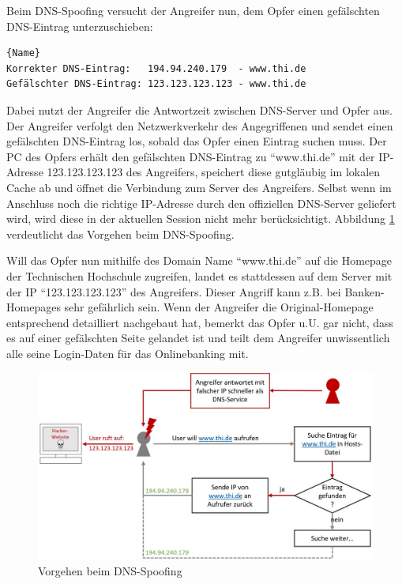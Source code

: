 Beim DNS-Spoofing versucht der Angreifer nun, dem Opfer einen gefälschten DNS-Eintrag unterzuschieben:
\begin{lstlisting}[caption=Echtes vs. gefälschtes DNS]{Name}
Korrekter DNS-Eintrag:   194.94.240.179  - www.thi.de
Gefälschter DNS-Eintrag: 123.123.123.123 - www.thi.de
\end{lstlisting}

Dabei nutzt der Angreifer die Antwortzeit zwischen DNS-Server und Opfer aus. Der Angreifer verfolgt den Netzwerkverkehr des Angegriffenen und sendet einen gefälschten DNS-Eintrag los, sobald das Opfer einen Eintrag suchen muss. Der PC des Opfers erhält den gefälschten DNS-Eintrag zu \enquote{www.thi.de} mit der IP-Adresse 123.123.123.123 des Angreifers, speichert diese gutgläubig im lokalen Cache ab und öffnet die Verbindung zum Server des Angreifers. Selbst wenn im Anschluss noch die richtige IP-Adresse durch den offiziellen DNS-Server geliefert wird, wird diese in der aktuellen Session nicht mehr berücksichtigt. Abbildung \ref{fig:poisoned_dns_lookup} verdeutlicht das Vorgehen beim DNS-Spoofing.

Will das Opfer nun mithilfe des Domain Name \enquote{www.thi.de} auf die Homepage der Technischen Hochschule zugreifen, landet es stattdessen auf dem Server mit der IP \enquote{123.123.123.123} des Angreifers. Dieser Angriff kann z.B. bei Banken-Homepages sehr gefährlich sein. Wenn der Angreifer die Original-Homepage entsprechend detailliert nachgebaut hat, bemerkt das Opfer u.U. gar nicht, dass es auf einer gefälschten Seite gelandet ist und teilt dem Angreifer unwissentlich alle seine Login-Daten für das Onlinebanking mit.

\begin{figure}[H]
	\centering
	\includegraphics[width=\textwidth]{images/DNS_Spoofing/poisoned_dns_lookup.jpg}
	\caption{Vorgehen beim DNS-Spoofing}
	\label{fig:poisoned_dns_lookup}
\end{figure}

